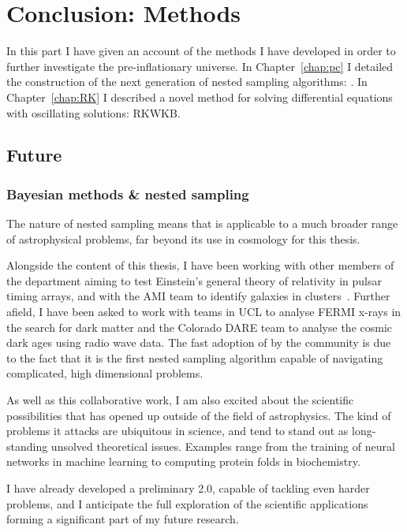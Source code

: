 \chapter*[Conclusion: Methods]{Conclusion: Methods}


In this part I have given an account of the methods I have developed in order to further investigate the pre-inflationary universe. In Chapter~\ref{chap:pc} I detailed the construction of the next generation of nested sampling algorithms: \PolyChord{}. In Chapter~\ref{chap:RK} I described a novel method for solving differential equations with oscillating solutions: RKWKB\@.

\section*{Future}
\subsection*{Bayesian methods \& nested sampling}
The nature of nested sampling means that \PolyChord{} is applicable to a much broader range of astrophysical problems, far beyond its use in cosmology for this thesis. 

Alongside the content of this thesis, I have been working with other members of the department aiming to test Einstein's general theory of relativity in pulsar timing arrays, and with the AMI team to identify galaxies in clusters~\citep{Rumsey}. Further afield, I have been asked to work with teams in UCL to analyse FERMI x-rays in the search for dark matter and the Colorado DARE team to analyse the cosmic dark ages using radio wave data. The fast adoption of \PolyChord{} by the community is due to the fact that it is the first nested sampling algorithm capable of navigating complicated, high dimensional problems.

As well as this collaborative work, I am also excited about the scientific possibilities that \PolyChord{} has opened up outside of the field of astrophysics. The kind of problems it attacks are ubiquitous in science, and tend to stand out as long-standing unsolved theoretical issues. Examples range from the training of neural networks in machine learning to computing protein folds in biochemistry.

I have already developed a preliminary \PolyChord{} 2.0, capable of tackling even harder problems, and I anticipate the full exploration of the scientific applications forming a significant part of my future research. 

